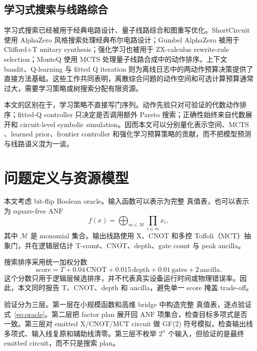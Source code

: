 \documentclass[UTF8,fontset=macnew,11pt]{ctexart}
\newcommand{\anf}{\ensuremath{\mathrm{ANF}}}
\newcommand{\mcts}{\ensuremath{\mathrm{MCTS}}}
\newcommand{\mct}{\ensuremath{\mathrm{MCT}}}
\newcommand{\score}{\ensuremath{\mathrm{score}}}
\newcommand{\ttable}{真值表}
\begin{document}
\subsection{学习式搜索与线路综合}

学习式搜索已经被用于经典电路设计、量子线路综合和图重写优化。ShortCircuit 使用 AlphaZero 风格搜索处理经典布尔电路设计\cite{tsaras2024shortcircuit}；Gumbel AlphaZero 被用于 Clifford+T unitary synthesis\cite{rietsch2024unitary}；强化学习也被用于 ZX-calculus rewrite-rule selection\cite{riu2025rlzx}；MonteQ 使用 \mcts{} 处理量子线路合成中的动作排序\cite{machiya2026monteq}。上下文 bandit、Q-learning 与 fitted Q iteration 则为离线日志中的两动作预算决策提供了直接方法基础\cite{li2010contextual,watkins1992qlearning,ernst2005fittedq}。这些工作共同表明，离散综合问题的动作空间和可选计算预算通常过大，需要学习策略或树搜索分配有限资源。

本文的区别在于，学习策略不直接写门序列。动作先验只对可验证的代数动作排序；fitted-Q controller 只决定是否调用额外 Pareto 搜索；正确性始终来自代数展开和 circuit-level symbolic simulation。因而本文可以分别量化表示空间、\mcts{}、learned prior、frontier controller 和强化学习预算策略的贡献，而不把模型预测与线路语义混为一谈。

\section{问题定义与资源模型}

本文考虑 bit-flip Boolean oracle。输入函数可以表示为完整 \ttable{}，也可以表示为 square-free \anf{}
\begin{equation}
  f(x)=\bigoplus_{m\in\mathcal{M}}\prod_{i\in m}x_i ,
  \label{eq:anf}
\end{equation}
其中 $\mathcal{M}$ 是 monomial 集合。输出线路使用 X、CNOT 和多控 Toffoli（\mct{}）抽象门，并在逻辑层估计 T-count、CNOT、depth、gate count 与 peak ancilla。

搜索排序采用统一加权分数
\begin{equation}
  \score = T + 0.04\,\mathrm{CNOT} + 0.015\,\mathrm{depth}
         + 0.01\,\mathrm{gates} + 2\,\mathrm{ancilla}.
  \label{eq:score}
\end{equation}
这个分数只用于逻辑层候选排序，并不代表真实设备运行时间或物理错误率。因此，本文同时报告 T、CNOT、depth 和 ancilla，避免单一 score 掩盖 trade-off。

验证分为三层。第一层在小规模函数和高维 bridge 中构造完整 \ttable{}，逐点验证式~\eqref{eq:oracle}。第二层把 factor plan 展开回 \anf{} 项集合，检查目标多项式是否一致。第三层对 emitted X/CNOT/\mct{} circuit 做 GF(2) 符号模拟，检查输出线多项式、输入线复原和辅助线清零。第三层不枚举 $2^n$ 个输入，但验证的是最终 emitted circuit，而不只是搜索 plan。
\end{document}
